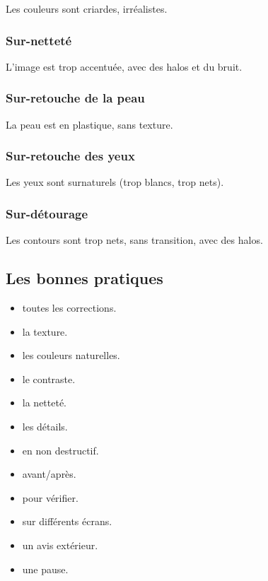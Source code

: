 Les couleurs sont criardes, irréalistes.

\subsubsection{Sur-netteté}

L'image est trop accentuée, avec des halos et du bruit.

\subsubsection{Sur-retouche de la peau}

La peau est en plastique, sans texture.

\subsubsection{Sur-retouche des yeux}

Les yeux sont surnaturels (trop blancs, trop nets).

\subsubsection{Sur-détourage}

Les contours sont trop nets, sans transition, avec des halos.

\subsection{Les bonnes pratiques}

\begin{itemize}
    \item {} toutes les corrections.
    \item {} la texture.
    \item {} les couleurs naturelles.
    \item {} le contraste.
    \item {} la netteté.
    \item {} les détails.
    \item {} en non destructif.
    \item {} avant/après.
    \item {} pour vérifier.
    \item {} sur différents écrans.
    \item {} un avis extérieur.
    \item {} une pause.
\end{itemize}

